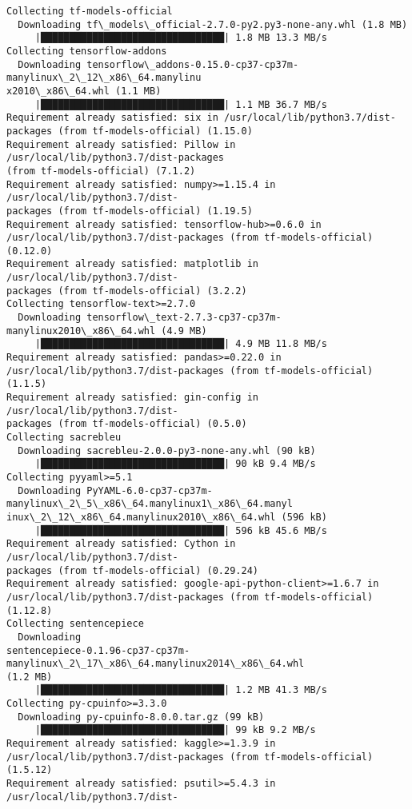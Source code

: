 \documentclass[11pt]{article}
\begin{document}
    \begin{Verbatim}[commandchars=\\\{\}]
Collecting tf-models-official
  Downloading tf\_models\_official-2.7.0-py2.py3-none-any.whl (1.8 MB)
     |████████████████████████████████| 1.8 MB 13.3 MB/s
Collecting tensorflow-addons
  Downloading tensorflow\_addons-0.15.0-cp37-cp37m-manylinux\_2\_12\_x86\_64.manylinu
x2010\_x86\_64.whl (1.1 MB)
     |████████████████████████████████| 1.1 MB 36.7 MB/s
Requirement already satisfied: six in /usr/local/lib/python3.7/dist-
packages (from tf-models-official) (1.15.0)
Requirement already satisfied: Pillow in /usr/local/lib/python3.7/dist-packages
(from tf-models-official) (7.1.2)
Requirement already satisfied: numpy>=1.15.4 in /usr/local/lib/python3.7/dist-
packages (from tf-models-official) (1.19.5)
Requirement already satisfied: tensorflow-hub>=0.6.0 in
/usr/local/lib/python3.7/dist-packages (from tf-models-official) (0.12.0)
Requirement already satisfied: matplotlib in /usr/local/lib/python3.7/dist-
packages (from tf-models-official) (3.2.2)
Collecting tensorflow-text>=2.7.0
  Downloading tensorflow\_text-2.7.3-cp37-cp37m-manylinux2010\_x86\_64.whl (4.9 MB)
     |████████████████████████████████| 4.9 MB 11.8 MB/s
Requirement already satisfied: pandas>=0.22.0 in
/usr/local/lib/python3.7/dist-packages (from tf-models-official) (1.1.5)
Requirement already satisfied: gin-config in /usr/local/lib/python3.7/dist-
packages (from tf-models-official) (0.5.0)
Collecting sacrebleu
  Downloading sacrebleu-2.0.0-py3-none-any.whl (90 kB)
     |████████████████████████████████| 90 kB 9.4 MB/s
Collecting pyyaml>=5.1
  Downloading PyYAML-6.0-cp37-cp37m-manylinux\_2\_5\_x86\_64.manylinux1\_x86\_64.manyl
inux\_2\_12\_x86\_64.manylinux2010\_x86\_64.whl (596 kB)
     |████████████████████████████████| 596 kB 45.6 MB/s
Requirement already satisfied: Cython in /usr/local/lib/python3.7/dist-
packages (from tf-models-official) (0.29.24)
Requirement already satisfied: google-api-python-client>=1.6.7 in
/usr/local/lib/python3.7/dist-packages (from tf-models-official) (1.12.8)
Collecting sentencepiece
  Downloading
sentencepiece-0.1.96-cp37-cp37m-manylinux\_2\_17\_x86\_64.manylinux2014\_x86\_64.whl
(1.2 MB)
     |████████████████████████████████| 1.2 MB 41.3 MB/s
Collecting py-cpuinfo>=3.3.0
  Downloading py-cpuinfo-8.0.0.tar.gz (99 kB)
     |████████████████████████████████| 99 kB 9.2 MB/s
Requirement already satisfied: kaggle>=1.3.9 in
/usr/local/lib/python3.7/dist-packages (from tf-models-official) (1.5.12)
Requirement already satisfied: psutil>=5.4.3 in /usr/local/lib/python3.7/dist-

\end{Verbatim}
\end{document}
